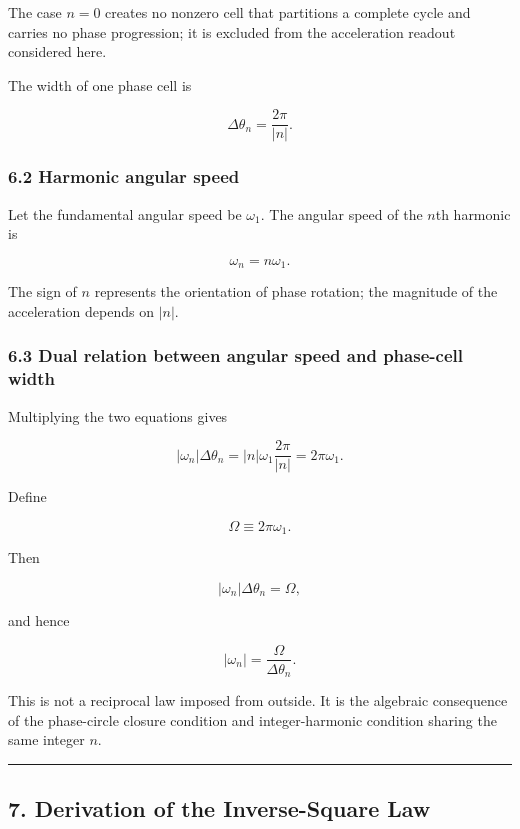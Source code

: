 \documentclass[
  10pt,
  a4paper,
]{article}
\begin{document}
The case \(n=0\) creates no nonzero cell that partitions a complete
cycle and carries no phase progression; it is excluded from the
acceleration readout considered here.

The width of one phase cell is

\[
\boxed{
\Delta\theta_n
=\frac{2\pi}{|n|}
}.
\]

\subsubsection{6.2 Harmonic angular speed}\label{harmonic-angular-speed}

Let the fundamental angular speed be \(\omega_1\). The angular speed of
the \(n\)th harmonic is

\[
\boxed{
\omega_n=n\omega_1
}.
\]

The sign of \(n\) represents the orientation of phase rotation; the
magnitude of the acceleration depends on \(|n|\).

\subsubsection{6.3 Dual relation between angular speed and phase-cell
width}\label{dual-relation-between-angular-speed-and-phase-cell-width}

Multiplying the two equations gives

\[
|\omega_n|\Delta\theta_n
=|n|\omega_1\frac{2\pi}{|n|}
=2\pi\omega_1.
\]

Define

\[
\Omega\equiv2\pi\omega_1.
\]

Then

\[
\boxed{
|\omega_n|\Delta\theta_n=\Omega
},
\]

and hence

\[
\boxed{
|\omega_n|
=\frac{\Omega}{\Delta\theta_n}
}.
\]

This is not a reciprocal law imposed from outside. It is the algebraic
consequence of the phase-circle closure condition and integer-harmonic
condition sharing the same integer \(n\).

\begin{center}\rule{0.5\linewidth}{0.5pt}\end{center}

\subsection{7. Derivation of the Inverse-Square
Law}\label{derivation-of-the-inverse-square-law}
\end{document}
